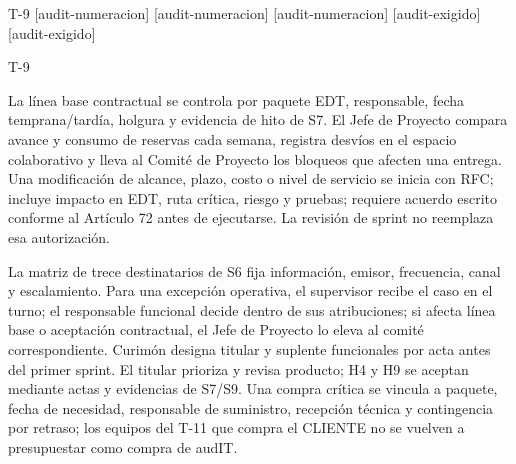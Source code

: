 \begin{formulario}{T-9}
\ExplSyntaxOff
{}[audit-numeracion]{\AuditAntesDeTabla}
[audit-numeracion]{\AuditEvaluarTabla}
[audit-numeracion]{\AuditMarcarNumerada}
\fi
[audit-exigido]{\AuditAntesDeTabla}
[audit-exigido]{\AuditEvaluarTabla}
\begin{contenidoExigido}{T-9}
\end{contenidoExigido}

La línea base contractual se controla por paquete EDT, responsable, fecha temprana/tardía, holgura y evidencia de hito de S7. El Jefe de Proyecto compara avance y consumo de reservas cada semana, registra desvíos en el espacio colaborativo y lleva al Comité de Proyecto los bloqueos que afecten una entrega. Una modificación de alcance, plazo, costo o nivel de servicio se inicia con RFC; incluye impacto en EDT, ruta crítica, riesgo y pruebas; requiere acuerdo escrito conforme al Artículo 72 antes de ejecutarse. La revisión de sprint no reemplaza esa autorización.

La matriz de trece destinatarios de S6 fija información, emisor, frecuencia, canal y escalamiento. Para una excepción operativa, el supervisor recibe el caso en el turno; el responsable funcional decide dentro de sus atribuciones; si afecta línea base o aceptación contractual, el Jefe de Proyecto lo eleva al comité correspondiente. Curimón designa titular y suplente funcionales por acta antes del primer sprint. El titular prioriza y revisa producto; H4 y H9 se aceptan mediante actas y evidencias de S7/S9. Una compra crítica se vincula a paquete, fecha de necesidad, responsable de suministro, recepción técnica y contingencia por retraso; los equipos del T-11 que compra el CLIENTE no se vuelven a presupuestar como compra de audIT.
\end{formulario}
